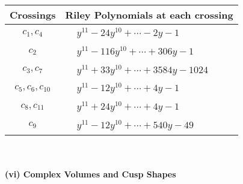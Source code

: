 \documentclass[1p]{elsarticle_modified}
\theoremstyle{definition}
\begin{document}
\begin{tabular}{m{50pt}|m{274pt}}
Crossings & \hspace{64pt}Riley Polynomials at each crossing \\
\hline $$\begin{aligned}c_{1},c_{4}\end{aligned}$$&$\begin{aligned}
&y^{11}-24 y^{10}+\cdots-2 y-1
\end{aligned}$\\
\hline $$\begin{aligned}c_{2}\end{aligned}$$&$\begin{aligned}
&y^{11}-116 y^{10}+\cdots+306 y-1
\end{aligned}$\\
\hline $$\begin{aligned}c_{3},c_{7}\end{aligned}$$&$\begin{aligned}
&y^{11}+33 y^{10}+\cdots+3584 y-1024
\end{aligned}$\\
\hline $$\begin{aligned}c_{5},c_{6},c_{10}\end{aligned}$$&$\begin{aligned}
&y^{11}-12 y^{10}+\cdots+4 y-1
\end{aligned}$\\
\hline $$\begin{aligned}c_{8},c_{11}\end{aligned}$$&$\begin{aligned}
&y^{11}+24 y^{10}+\cdots+4 y-1
\end{aligned}$\\
\hline $$\begin{aligned}c_{9}\end{aligned}$$&$\begin{aligned}
&y^{11}-12 y^{10}+\cdots+540 y-49
\end{aligned}$\\
\hline
\end{tabular}\\~\\
\newpage\flushleft \textbf{(vi) Complex Volumes and Cusp Shapes}
\end{document}
